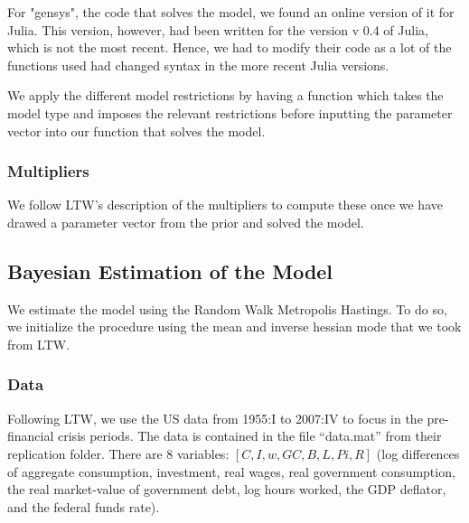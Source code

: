 \documentclass[letterpaper,12pt]{article}%
\begin{document}
For "gensys", the code that solves the model, we found an online version of it for Julia. This version, however, had been written for the version v 0.4 of Julia, which is not the most recent. Hence, we had to modify their code as a lot of the functions used had changed syntax in the more recent Julia versions.

We apply the different model restrictions by having a function which takes the model type and imposes the relevant restrictions before inputting the parameter vector into our function that solves the model.

\subsubsection{Multipliers}
We follow LTW's description of the multipliers to compute these once we have drawed a parameter vector from the prior and solved the model.

\subsection{Bayesian Estimation of the Model}
We estimate the model using the Random Walk Metropolis Hastings. To do so, we initialize the procedure using the mean and inverse hessian mode that we took from LTW.

\subsubsection*{Data}
Following LTW, we use the US data from 1955:I to 2007:IV to focus in the pre-financial crisis periods. The data is contained in the file ``data.mat'' from their replication folder. There are 8 variables: $[C, I, w, GC, B, L, Pi, R]$ (log differences of aggregate consumption, investment, real wages, real government consumption, the real market-value of government debt, log hours worked, the GDP deflator, and the federal funds rate).
\end{document}
